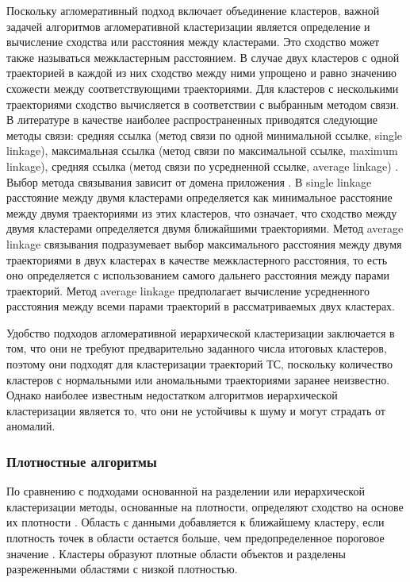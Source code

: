 Поскольку агломеративный подход включает объединение кластеров, важной задачей алгоритмов агломеративной кластеризации является определение и вычисление сходства или расстояния между кластерами. Это сходство может также называться межкластерным расстоянием. В случае двух кластеров с одной траекторией в каждой из них сходство между ними упрощено и равно значению схожести между соответствующими траекториями. Для кластеров с несколькими траекториями сходство вычисляется в соответствии с выбранным методом связи. В литературе в качестве наиболее распространенных приводятся следующие методы связи: средняя ссылка (метод связи по одной минимальной ссылке, single linkage), максимальная ссылка (метод связи по максимальной ссылке, maximum linkage), средняя ссылка (метод связи по усредненной ссылке, average linkage) \cite{article:23_survey_ca}\cite{inproceedings:7_related_work}. Выбор метода связывания зависит от домена приложения \cite{online:what_is_hier_clust}. В single linkage расстояние между двумя кластерами определяется как минимальное расстояние между двумя траекториями из этих кластеров, что означает, что сходство между двумя кластерами определяется двумя ближайшими траекториями. Метод average linkage связывания подразумевает выбор максимального расстояния между двумя траекториями в двух кластерах в качестве межкластерного расстояния, то есть оно определяется с использованием самого дальнего расстояния между парами траекторий. Метод average linkage предполагает вычисление усредненного расстояния между всеми парами траекторий в рассматриваемых двух кластерах.

Удобство подходов агломеративной иерархической кластеризации заключается в том, что они не требуют предварительно заданного числа итоговых кластеров, поэтому они подходят для кластеризации траекторий ТС, поскольку количество кластеров с нормальными или аномальными траекториями заранее неизвестно. Однако наиболее известным недостатком алгоритмов иерархической кластеризации является то, что они не устойчивы к шуму и могут страдать от аномалий.

\subsubsection{Плотностные алгоритмы}

По сравнению с подходами основанной на разделении или иерархической кластеризации методы, основанные на плотности, определяют сходство на основе их плотности \cite{article:22_survey_dscc}. Область с данными добавляется к ближайшему кластеру, если плотность точек в области остается больше, чем предопределенное пороговое значение \cite{article:8_review_mot_cl_alg}. Кластеры образуют плотные области объектов и разделены разреженными областями с низкой плотностью.

